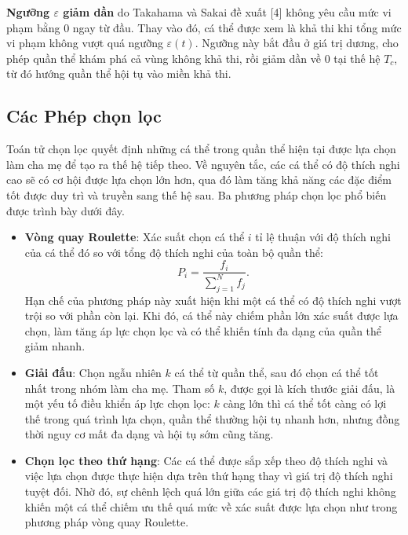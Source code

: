 \textbf{Ngưỡng $\varepsilon$ giảm dần} do Takahama và Sakai đề xuất [4]
không yêu cầu mức vi phạm bằng $0$ ngay từ đầu. Thay vào đó, cá thể
được xem là khả thi khi tổng mức vi phạm không vượt quá ngưỡng
$\varepsilon(t)$. Ngưỡng này bắt đầu ở giá trị dương, cho phép quần
thể khám phá cả vùng không khả thi, rồi giảm dần về $0$ tại thế hệ
$T_c$, từ đó hướng quần thể hội tụ vào miền khả thi.

\subsection*{Các Phép chọn lọc}
\label{subsec:chon-loc}

Toán tử chọn lọc quyết định những cá thể trong quần thể hiện tại được
lựa chọn làm cha mẹ để tạo ra thế hệ tiếp theo. Về nguyên tắc, các cá
thể có độ thích nghi cao sẽ có cơ hội được lựa chọn lớn hơn, qua đó
làm tăng khả năng các đặc điểm tốt được duy trì và truyền sang thế hệ
sau. Ba phương pháp chọn lọc phổ biến được trình bày dưới đây.

\begin{itemize}
    \item \textbf{Vòng quay Roulette}: Xác
    suất chọn cá thể $i$ tỉ lệ thuận với độ thích nghi của cá thể đó so
    với tổng độ thích nghi của toàn bộ quần thể:
    \begin{equation}
    P_i = \frac{f_i}{\sum_{j=1}^{N} f_j}.
    \label{eq:roulette}
    \end{equation}
    Hạn chế của phương pháp này xuất hiện khi một cá thể có độ thích
    nghi vượt trội so với phần còn lại. Khi đó, cá thể này chiếm phần
    lớn xác suất được lựa chọn, làm tăng áp lực chọn lọc và có thể
    khiến tính đa dạng của quần thể giảm nhanh.
    \item \textbf{Giải đấu}: Chọn ngẫu nhiên $k$
    cá thể từ quần thể, sau đó chọn cá thể tốt nhất trong nhóm làm cha
    mẹ. Tham số $k$, được gọi là kích thước giải đấu, là một yếu tố
    điều khiển áp lực chọn lọc: $k$ càng lớn thì cá thể tốt càng có
    lợi thế trong quá trình lựa chọn, quần thể thường hội tụ nhanh
    hơn, nhưng đồng thời nguy cơ mất đa dạng và hội tụ sớm cũng tăng.
    \item \textbf{Chọn lọc theo thứ hạng}: Các cá
    thể được sắp xếp theo độ thích nghi và việc lựa chọn được thực
    hiện dựa trên thứ hạng thay vì giá trị độ thích nghi tuyệt đối.
    Nhờ đó, sự chênh lệch quá lớn giữa các giá trị độ thích nghi không
    khiến một cá thể chiếm ưu thế quá mức về xác suất được lựa chọn
    như trong phương pháp vòng quay Roulette.
\end{itemize}

